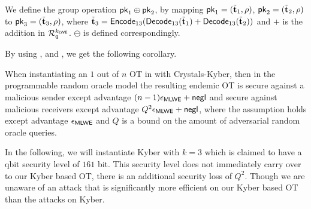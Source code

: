 We define the group operation $\mathsf{pk}_1\oplus\mathsf{pk}_2$, by mapping $\mathsf{pk}_1=(\tilde{{\mathbf t}}_1,\rho)$, $\mathsf{pk}_2=(\tilde{{\mathbf t}}_2,\rho)$ to $\mathsf{pk}_3=(\tilde{{\mathbf t}}_3, \rho)$, where $\tilde{{\mathbf t}}_3=\mathsf{Encode}_{13}(\mathsf{Decode}_{13}(\tilde{{\mathbf t}}_1)+\mathsf{Decode}_{13}(\tilde{{\mathbf t}}_2))$ and $+$ is the addition in $\mathcal R_q^{k_{\mathsf{LWE}}}$. $\ominus$ is defined correspondingly. 

By using ,  and , we get the following corollary.
 
\begin{corollary}
When instantiating an $1$ out of $n$ OT in  with Crystals-Kyber, then in the programmable random oracle model the resulting endemic OT is secure against a malicious sender except advantage $(n-1)\epsilon_{\mathsf{MLWE}}+\mathsf{negl}$  and secure against malicious receivers except advantage $Q^2\epsilon_{\mathsf{MLWE}}+\mathsf{negl}$, where the \MLWE assumption holds except advantage $\epsilon_{\mathsf{MLWE}}$ and $Q$ is a bound on the amount of adversarial random oracle queries.
\end{corollary}

In the following, we will instantiate Kyber with $k=3$ which is claimed to have a qbit security level of $161$ bit. This security level does not immediately carry over to our Kyber based OT, there is an additional security loss of $Q^2$. Though we are unaware of an attack that is significantly more efficient on our Kyber based OT than the attacks on Kyber.